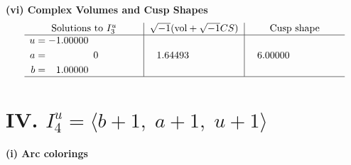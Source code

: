 \documentclass[1p]{elsarticle_modified}
\theoremstyle{definition}
\newcommand{\I}{\sqrt{-1}}
\begin{document}
\newpage\flushleft \textbf{(vi) Complex Volumes and Cusp Shapes}
$$\begin{array}{c|c|c}  
\text{Solutions to }I^u_{3}& \I (\text{vol} + \sqrt{-1}CS) & \text{Cusp shape}\\
 \hline 
\begin{aligned}
u &= -1.00000\phantom{ +0.000000I} \\
a &= \phantom{-0.000000 } 0 \\
b &= \phantom{-}1.00000\phantom{ +0.000000I}\end{aligned}
 & \phantom{-}1.64493\phantom{ +0.000000I} & \phantom{-}6.00000\phantom{ +0.000000I}\\
 \hline 
 \end{array}$$\newpage\newpage\renewcommand{\arraystretch}{1}
\centering \section*{IV. $I^u_{4}= \langle b+1,\;a+1,\;u+1 \rangle$}
\flushleft \textbf{(i) Arc colorings}\\
\end{document}
